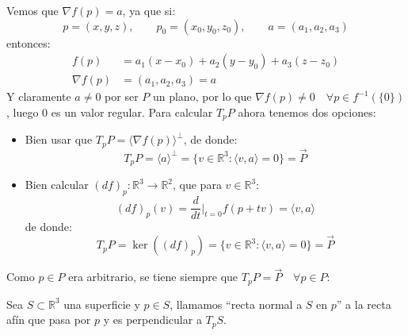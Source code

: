 \begin{ejemplo}
\begin{enumerate}
            Vemos que $\nabla f(p) = a$, ya que si:
            \begin{equation*}
                p = (x,y,z), \qquad p_0 = (x_0,y_0,z_0), \qquad a = (a_1,a_2,a_3)
            \end{equation*}
            entonces:
            \begin{align*}
                f(p) &= a_1(x-x_0) + a_2(y-y_0) + a_3(z-z_0) \\
                \nabla f(p) &= (a_1, a_2, a_3) = a
            \end{align*}
            Y claramente $a\neq 0$ por ser $P$ un plano, por lo que $\nabla f(p)\neq 0\quad \forall p\in f^{-1}(\{0\})$, luego $0$ es un valor regular. Para calcular $T_pP$ ahora tenemos dos opciones:
            \begin{itemize}
                \item Bien usar que $T_pP = \langle \nabla f(p) \rangle^\perp $, de donde:
                    \begin{equation*}
                        T_pP = \langle a \rangle^\perp = \{v\in \mathbb{R}^3 : \langle v,a \rangle =0\} = \vec{P}
                    \end{equation*}
                \item Bien calcular $(d f)_p:\mathbb{R}^3\to \mathbb{R}^2$, que para $v\in \mathbb{R}^3$:
                    \begin{equation*}
                        (d f)_p(v) = \frac{d}{dt}\big|_{t=0} f(p+tv)= \langle v,a \rangle 
                    \end{equation*}
                    de donde:
                    \begin{equation*}
                        T_pP = \ker((d f)_p) = \{v\in \mathbb{R}^3 : \langle v,a \rangle =0\}  = \vec{P}
                    \end{equation*}
            \end{itemize}
            Como $p\in P$ era arbitrario, se tiene siempre que $T_pP = \vec{P}\quad \forall p\in P$:
    \end{enumerate}
\end{ejemplo}

\begin{definicion}
    Sea $S\subset \mathbb{R}^3$ una superficie y $p\in S$, llamamos ``recta normal a $S$ en $p$'' a la recta afín que pasa por $p$ y es perpendicular a $T_pS$.
\end{definicion}

